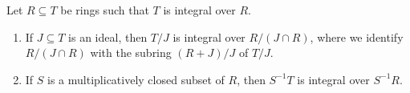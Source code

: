 Let $R \subseteq T$ be rings such that $T$ is integral over $R$.
\begin{enumerate}[label=(\roman*)]
	\item If $J \subseteq T$ is an ideal, then $T/J$ is integral over $R/(J\cap R)$,
		where we identify $R/(J\cap R)$ with the subring $(R+J)/J$ of $T/J$.
	\item If $S$ is a multiplicatively closed subset of $R$, then $S^{-1}T$ is
		integral over $S^{-1}R$.
\end{enumerate}
